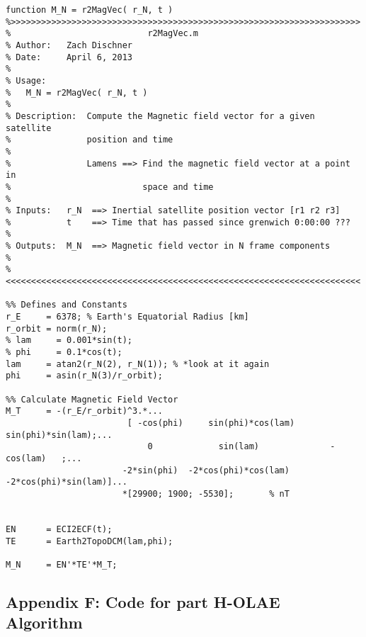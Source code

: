 \documentclass[11pt]{aiaa-tc}%
\begin{document}
\label{APP:Code for Part E}
\begin{lstlisting}
function M_N = r2MagVec( r_N, t )
%>>>>>>>>>>>>>>>>>>>>>>>>>>>>>>>>>>>>>>>>>>>>>>>>>>>>>>>>>>>>>>>>>>>>> 
%                           r2MagVec.m
% Author:   Zach Dischner
% Date:     April 6, 2013
% 
% Usage:
%   M_N = r2MagVec( r_N, t )
%
% Description:  Compute the Magnetic field vector for a given satellite
%               position and time
% 
%               Lamens ==> Find the magnetic field vector at a point in
%                          space and time
% 
% Inputs:   r_N  ==> Inertial satellite position vector [r1 r2 r3]
%           t    ==> Time that has passed since grenwich 0:00:00 ???
%
% Outputs:  M_N  ==> Magnetic field vector in N frame components
% 
%<<<<<<<<<<<<<<<<<<<<<<<<<<<<<<<<<<<<<<<<<<<<<<<<<<<<<<<<<<<<<<<<<<<<<<

%% Defines and Constants
r_E     = 6378; % Earth's Equatorial Radius [km]
r_orbit = norm(r_N);
% lam     = 0.001*sin(t);
% phi     = 0.1*cos(t);
lam     = atan2(r_N(2), r_N(1)); % *look at it again
phi     = asin(r_N(3)/r_orbit);

%% Calculate Magnetic Field Vector
M_T     = -(r_E/r_orbit)^3.*...
                        [ -cos(phi)     sin(phi)*cos(lam)     sin(phi)*sin(lam);...
                            0             sin(lam)              -cos(lam)   ;...
                       -2*sin(phi)  -2*cos(phi)*cos(lam)   -2*cos(phi)*sin(lam)]...
                       *[29900; 1900; -5530];       % nT
                   
                   
EN      = ECI2ECF(t);
TE      = Earth2TopoDCM(lam,phi);

M_N     = EN'*TE'*M_T;
\end{lstlisting}

\subsection{Appendix F: Code for part H-OLAE Algorithm}
\end{document}
